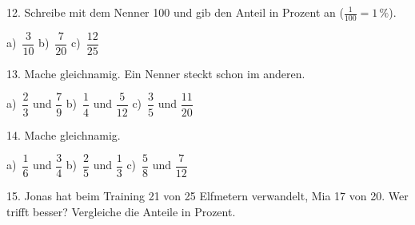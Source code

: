 \documentclass[11pt]{article}
\begin{document}
\begin{pfaufg}{}{12.}{}
Schreibe mit dem Nenner 100 und gib den Anteil in Prozent an ($\frac{1}{100} = 1\,\%$). \par\vspace{3pt} a)~$\dfrac{3}{10}$ \qquad b)~$\dfrac{7}{20}$ \qquad c)~$\dfrac{12}{25}$
\end{pfaufg}

\begin{pfaufg}{}{13.}{}
Mache gleichnamig. Ein Nenner steckt schon im anderen. \par\vspace{3pt} a)~$\dfrac{2}{3}$ und $\dfrac{7}{9}$ \qquad b)~$\dfrac{1}{4}$ und $\dfrac{5}{12}$ \qquad c)~$\dfrac{3}{5}$ und $\dfrac{11}{20}$
\end{pfaufg}

\begin{pfaufg}{}{14.}{}
Mache gleichnamig. \par\vspace{3pt} a)~$\dfrac{1}{6}$ und $\dfrac{3}{4}$ \qquad b)~$\dfrac{2}{5}$ und $\dfrac{1}{3}$ \qquad c)~$\dfrac{5}{8}$ und $\dfrac{7}{12}$
\end{pfaufg}

\begin{pfaufg}{}{15.}{}
Jonas hat beim Training 21 von 25 Elfmetern verwandelt, Mia 17 von 20. Wer trifft besser? Vergleiche die Anteile in Prozent.
\end{pfaufg}
\end{document}
